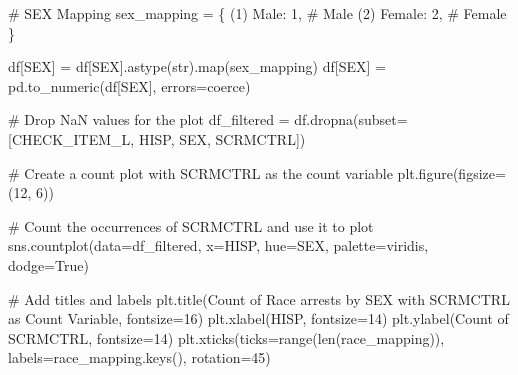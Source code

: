 \documentclass[
  letterpaper,
  DIV=11,
  numbers=noendperiod]{scrreprt}
\newenvironment{Shaded}{\begin{snugshade}}{\end{snugshade}}
\newcommand{\BuiltInTok}[1]{\textcolor[rgb]{0.00,0.23,0.31}{#1}}
\newcommand{\CommentTok}[1]{\textcolor[rgb]{0.37,0.37,0.37}{#1}}
\newcommand{\DecValTok}[1]{\textcolor[rgb]{0.68,0.00,0.00}{#1}}
\newcommand{\NormalTok}[1]{\textcolor[rgb]{0.00,0.23,0.31}{#1}}
\newcommand{\OperatorTok}[1]{\textcolor[rgb]{0.37,0.37,0.37}{#1}}
\newcommand{\StringTok}[1]{\textcolor[rgb]{0.13,0.47,0.30}{#1}}
\newcommand{\VariableTok}[1]{\textcolor[rgb]{0.07,0.07,0.07}{#1}}
\begin{document}
\begin{Shaded}
\begin{Highlighting}[]
\CommentTok{\# SEX Mapping}
\NormalTok{sex\_mapping }\OperatorTok{=}\NormalTok{ \{}
    \StringTok{\textquotesingle{}(1) Male\textquotesingle{}}\NormalTok{: }\DecValTok{1}\NormalTok{,   }\CommentTok{\# Male}
    \StringTok{\textquotesingle{}(2) Female\textquotesingle{}}\NormalTok{: }\DecValTok{2}\NormalTok{, }\CommentTok{\# Female}
\NormalTok{\}}

\NormalTok{df[}\StringTok{\textquotesingle{}SEX\textquotesingle{}}\NormalTok{] }\OperatorTok{=}\NormalTok{ df[}\StringTok{\textquotesingle{}SEX\textquotesingle{}}\NormalTok{].astype(}\BuiltInTok{str}\NormalTok{).}\BuiltInTok{map}\NormalTok{(sex\_mapping)}
\NormalTok{df[}\StringTok{\textquotesingle{}SEX\textquotesingle{}}\NormalTok{] }\OperatorTok{=}\NormalTok{ pd.to\_numeric(df[}\StringTok{\textquotesingle{}SEX\textquotesingle{}}\NormalTok{], errors}\OperatorTok{=}\StringTok{\textquotesingle{}coerce\textquotesingle{}}\NormalTok{)}

\CommentTok{\# Drop NaN values for the plot}
\NormalTok{df\_filtered }\OperatorTok{=}\NormalTok{ df.dropna(subset}\OperatorTok{=}\NormalTok{[}\StringTok{\textquotesingle{}CHECK\_ITEM\_L\textquotesingle{}}\NormalTok{, }\StringTok{\textquotesingle{}HISP\textquotesingle{}}\NormalTok{, }\StringTok{\textquotesingle{}SEX\textquotesingle{}}\NormalTok{, }\StringTok{\textquotesingle{}SCRMCTRL\textquotesingle{}}\NormalTok{])}

\CommentTok{\# Create a count plot with SCRMCTRL as the count variable}
\NormalTok{plt.figure(figsize}\OperatorTok{=}\NormalTok{(}\DecValTok{12}\NormalTok{, }\DecValTok{6}\NormalTok{))}

\CommentTok{\# Count the occurrences of SCRMCTRL and use it to plot}
\NormalTok{sns.countplot(data}\OperatorTok{=}\NormalTok{df\_filtered, x}\OperatorTok{=}\StringTok{\textquotesingle{}HISP\textquotesingle{}}\NormalTok{, hue}\OperatorTok{=}\StringTok{\textquotesingle{}SEX\textquotesingle{}}\NormalTok{, palette}\OperatorTok{=}\StringTok{\textquotesingle{}viridis\textquotesingle{}}\NormalTok{, dodge}\OperatorTok{=}\VariableTok{True}\NormalTok{)}

\CommentTok{\# Add titles and labels}
\NormalTok{plt.title(}\StringTok{\textquotesingle{}Count of Race arrests by SEX with SCRMCTRL as Count Variable\textquotesingle{}}\NormalTok{, fontsize}\OperatorTok{=}\DecValTok{16}\NormalTok{)}
\NormalTok{plt.xlabel(}\StringTok{\textquotesingle{}HISP\textquotesingle{}}\NormalTok{, fontsize}\OperatorTok{=}\DecValTok{14}\NormalTok{)}
\NormalTok{plt.ylabel(}\StringTok{\textquotesingle{}Count of SCRMCTRL\textquotesingle{}}\NormalTok{, fontsize}\OperatorTok{=}\DecValTok{14}\NormalTok{)}
\NormalTok{plt.xticks(ticks}\OperatorTok{=}\BuiltInTok{range}\NormalTok{(}\BuiltInTok{len}\NormalTok{(race\_mapping)), labels}\OperatorTok{=}\NormalTok{race\_mapping.keys(), rotation}\OperatorTok{=}\DecValTok{45}\NormalTok{)}


\end{Highlighting}
\end{Shaded}
\end{document}
